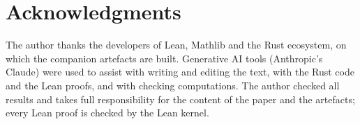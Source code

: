 \documentclass[11pt]{article}
\theoremstyle{definition}
\begin{document}
\section*{Acknowledgments}
The author thanks the developers of Lean, Mathlib and the Rust ecosystem, on which the companion artefacts are built.
Generative AI tools (Anthropic's Claude) were used to assist with writing and editing the text, with the Rust code and the Lean proofs, and with checking computations.
The author checked all results and takes full responsibility for the content of the paper and the artefacts; every Lean proof is checked by the Lean kernel.




\appendix


\end{document}

